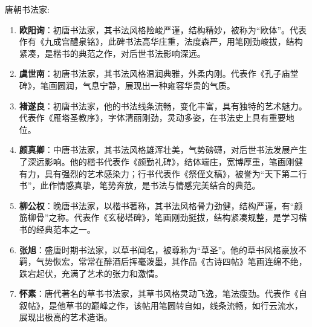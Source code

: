 \documentclass{ctexart}
\begin{document}
唐朝书法家:
\begin{enumerate}
    \item \textbf{欧阳询}：初唐书法家，其书法风格险峻严谨，结构精妙，被称为“欧体”。代表作有《九成宫醴泉铭》，此碑书法高华庄重，法度森严，用笔刚劲峻拔，结构紧凑，是楷书的典范之作，对后世书法影响深远。
    \item \textbf{虞世南}：初唐书法家，其书法风格温润典雅，外柔内刚。代表作《孔子庙堂碑》，笔画圆润，气息宁静，展现出一种雍容华贵的气质。
    \item \textbf{褚遂良}：初唐书法家，他的书法线条流畅，变化丰富，具有独特的艺术魅力。代表作《雁塔圣教序》，字体清丽刚劲，灵动多姿，在书法史上具有重要地位。
    \item \textbf{颜真卿}：中唐书法家，其书法风格雄浑壮美，气势磅礴，对后世书法发展产生了深远影响。他的楷书代表作《颜勤礼碑》，结体端庄，宽博厚重，笔画刚健有力，具有强烈的艺术感染力；行书代表作《祭侄文稿》，被誉为“天下第二行书”，此作情感真挚，笔势奔放，是书法与情感完美结合的典范。
    \item \textbf{柳公权}：晚唐书法家，以楷书著称，其书法风格骨力劲健，结构严谨，有“颜筋柳骨”之称。代表作《玄秘塔碑》，笔画刚劲挺拔，结构紧凑规整，是学习楷书的经典范本之一。
    \item \textbf{张旭}：盛唐时期书法家，以草书闻名，被尊称为“草圣”。他的草书风格豪放不羁，气势恢宏，常常在醉酒后挥毫泼墨，其作品《古诗四帖》笔画连绵不绝，跌宕起伏，充满了艺术的张力和激情。
    \item \textbf{怀素}：唐代著名的草书书法家，其草书风格灵动飞逸，笔法瘦劲。代表作《自叙帖》，是他草书的巅峰之作，该帖用笔圆转自如，线条流畅，如行云流水，展现出极高的艺术造诣。
\end{enumerate}
\end{document}
